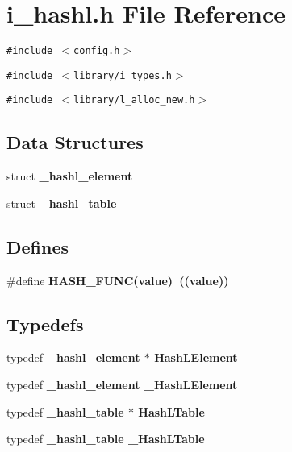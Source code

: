 \section{i\_\-hashl.h File Reference}
\label{i__hashl_8h}
{\tt \#include $<$config.h$>$}\par
{\tt \#include $<$library/i\_\-types.h$>$}\par
{\tt \#include $<$library/l\_\-alloc\_\-new.h$>$}\par
\subsection*{Data Structures}
\begin{CompactItemize}
\item 
struct \bf{\_\-hashl\_\-element}
\item 
struct \bf{\_\-hashl\_\-table}
\end{CompactItemize}
\subsection*{Defines}
\begin{CompactItemize}
\item 
\#define \bf{HASH\_\-FUNC}(value)~((value))
\end{CompactItemize}
\subsection*{Typedefs}
\begin{CompactItemize}
\item 
typedef \bf{\_\-hashl\_\-element} $\ast$ \bf{Hash\-LElement}
\item 
typedef \bf{\_\-hashl\_\-element} \bf{\_\-Hash\-LElement}
\item 
typedef \bf{\_\-hashl\_\-table} $\ast$ \bf{Hash\-LTable}
\item 
typedef \bf{\_\-hashl\_\-table} \bf{\_\-Hash\-LTable}
\end{CompactItemize}
